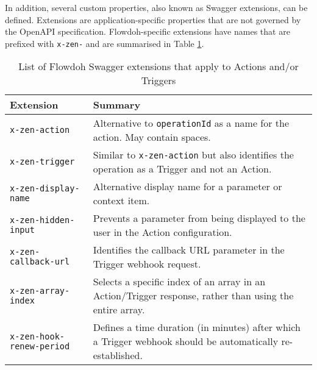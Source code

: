 In addition, several custom properties, also known as Swagger extensions, can be defined. Extensions are application-specific properties that are not governed by the OpenAPI specification\cite{extensions}. Flowdoh-specific extensions have names that are prefixed with \texttt{x-zen-} and are summarised in Table \ref{table:extensions}.
\begin{table}[h!]
\centering
    \begin{tabularx}{0.9\textwidth}{ X X }
        \hline
        Extension & Summary \\
        \hline
        \texttt{x-zen-action} & Alternative to \texttt{operationId} as a name for the action. May contain spaces. \\
        \hline
        \texttt{x-zen-trigger} & Similar to \texttt{x-zen-action} but also identifies the operation as a Trigger and not an Action. \\
        \hline
        \texttt{x-zen-display-name} & Alternative display name for a parameter or context item. \\
        \hline
        \texttt{x-zen-hidden-input} & Prevents a parameter from being displayed to the user in the Action configuration. \\
        \hline
        \texttt{x-zen-callback-url} & Identifies the callback URL parameter in the Trigger webhook request. \\
        \hline
        \texttt{x-zen-array-index} & Selects a specific index of an array in an Action/Trigger response, rather than using the entire array. \\
        \hline
        \texttt{x-zen-hook-renew-period} & Defines a time duration (in minutes) after which a Trigger webhook should be automatically re-established. \\
        \hline
    \end{tabularx}
    \caption{List of Flowdoh Swagger extensions that apply to Actions and/or Triggers}
    \label{table:extensions}
\end{table}
